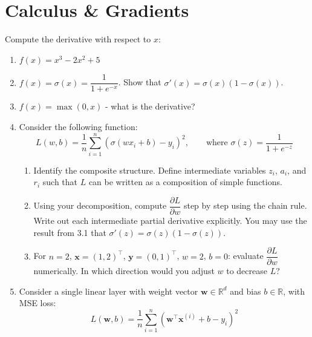 \documentclass[12pt, a4paper]{scrartcl}
\begin{document}
\section{Calculus \& Gradients}

Compute the derivative with respect to $x$:

\begin{enumerate}

    \item $f(x) = x^3 - 2x^2 + 5$

    \item $f(x) = \sigma(x) = \dfrac{1}{1 + e^{-x}}$. Show that $\sigma'(x)
    = \sigma(x)(1 - \sigma(x))$.

    \item $f(x) = \max(0, x)$ - what is the derivative?

\item Consider the following function:
\[
L(w, b) = \frac{1}{n}\sum_{i=1}^{n}\left(\sigma(wx_i + b) - y_i\right)^2,
\qquad \text{where } \sigma(z) = \frac{1}{1+e^{-z}}
\]

\begin{enumerate}

    \item Identify the composite structure. Define intermediate variables $z_i$,
    $a_i$, and $r_i$ such that $L$ can be written as a composition of simple
    functions.

    \item Using your decomposition, compute $\dfrac{\partial L}{\partial w}$
    step by step using the chain rule. Write out each intermediate partial
    derivative explicitly. You may use the result from 3.1 that $\sigma'(z) =
    \sigma(z)(1-\sigma(z))$.

    \item For $n=2$, $\mathbf{x} = (1, 2)^\top$, $\mathbf{y} = (0, 1)^\top$,
    $w = 2$, $b = 0$: evaluate $\dfrac{\partial L}{\partial w}$ numerically.
    In which direction would you adjust $w$ to decrease $L$?

\end{enumerate}

\item Consider a single linear layer with weight vector $\mathbf{w} \in \mathbb{R}^d$
and bias $b \in \mathbb{R}$, with MSE loss:
\[
L(\mathbf{w}, b) = \frac{1}{n}\sum_{i=1}^{n}
\left(\mathbf{w}^\top \mathbf{x}^{(i)} + b - y_i\right)^2
\]


\end{enumerate}
\end{document}
